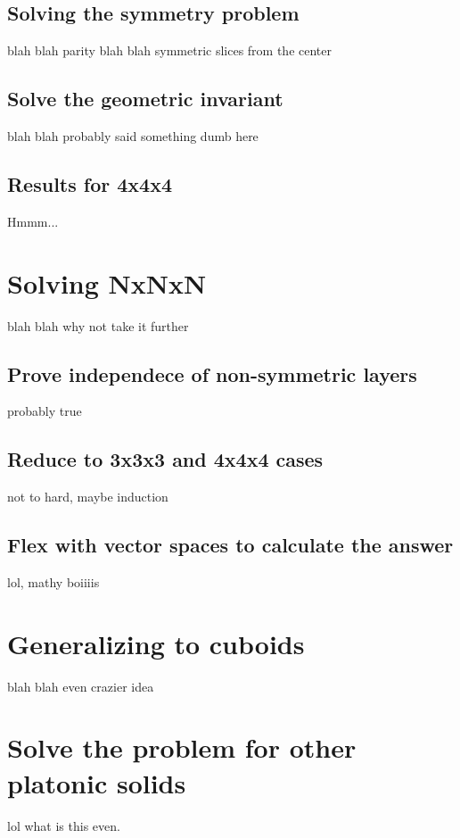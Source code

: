 \documentclass{article}
\begin{document}
        \subsection{Solving the symmetry problem}
            blah blah parity blah blah symmetric slices from the center
        
        \subsection{Solve the geometric invariant}
            blah blah probably said something dumb here

        \subsection{Results for 4x4x4}
            Hmmm...

    \section{Solving NxNxN}
        blah blah why not take it further

        \subsection{Prove independece of non-symmetric layers}
            probably true

        \subsection{Reduce to 3x3x3 and 4x4x4 cases}
            not to hard, maybe induction

        \subsection{Flex with vector spaces to calculate the answer}
            lol, mathy boiiiis
    
    \section{Generalizing to cuboids}
        blah blah even crazier idea

    \section{Solve the problem for other platonic solids}
        lol what is this even.
\end{document}
